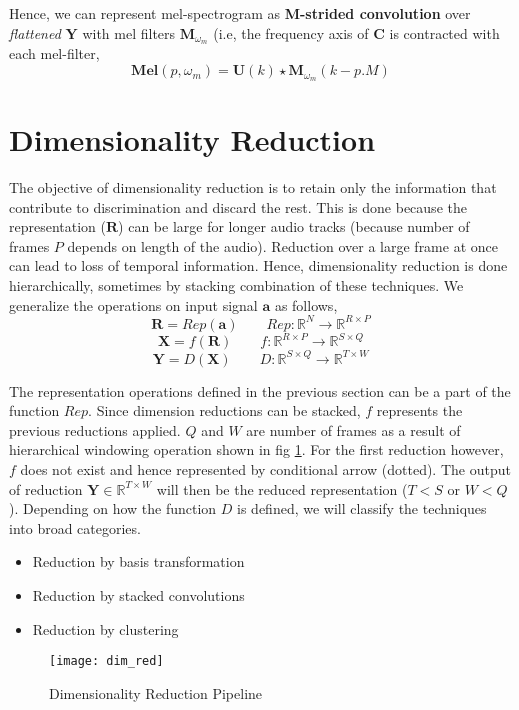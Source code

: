\noindent Hence, we can represent mel-spectrogram as \textbf{M-strided convolution} over \textit{flattened} $\textbf{Y}$ with mel filters $\textbf{M}_{\omega_{m}}$ (i.e, the frequency axis of $\textbf{C}$ is contracted with each mel-filter, 
\begin{equation}
\label{eq:mel}
\boxed
{
  \textbf{Mel}(p, \omega_{m} ) = \textbf{U}(k) \star \textbf{M}_{\omega_{m}}(k - p.M)
}
\end{equation}
  
\bigskip

\section{Dimensionality Reduction}
\label{dimension}
The objective of dimensionality reduction is to retain only the information that contribute to discrimination and discard the rest. This is done because the representation ($\textbf{R}$) can be large for longer audio tracks (because number of frames $P$ depends on length of the audio). Reduction over a large frame at once can lead to loss of temporal information. Hence, dimensionality reduction is done hierarchically, sometimes by stacking combination of these techniques. We generalize the operations on input signal $\textbf{a}$ as follows,
\[
   \textbf{R} = Rep(\textbf{a}) \qquad Rep : \mathbb{R}^{N} \rightarrow \mathbb{R}^{R \times P}
\]
\[
   \textbf{X} = f(\textbf{R}) \qquad f : \mathbb{R}^{R \times P} \rightarrow \mathbb{R}^{S \times Q} 
\]
\begin{equation}
\label{dim_red_abstract}
   \textbf{Y} = D(\textbf{X}) \qquad D : \mathbb{R}^{S \times Q} \rightarrow \mathbb{R}^{T \times W} 
\end{equation}
 

\noindent The representation operations defined in the previous section can be a part of the function $Rep$. Since dimension reductions can be stacked, $f$ represents the previous reductions applied. $Q$ and $W$ are number of frames as a result of hierarchical windowing operation shown in fig \ref{fig:Dimensionality Reduction}. For the first reduction however, $f$ does not exist and hence represented by conditional arrow (dotted). The output of reduction $\textbf{Y} \in \mathbb{R}^{T \times W}$ will then be the reduced representation ($T < S$ or $W < Q$). Depending on how the function $D$ is defined, we will classify the techniques into broad categories.
\begin{itemize}
  \item Reduction by basis transformation
  \item Reduction by stacked convolutions
  \item Reduction by clustering 
\end{itemize} 
\begin{figure}[h] 
\centering
\texttt{[image: dim\_red]}
\caption{Dimensionality Reduction Pipeline}
 \label{fig:Dimensionality Reduction}
 \end{figure}
\FloatBarrier
\bigskip

